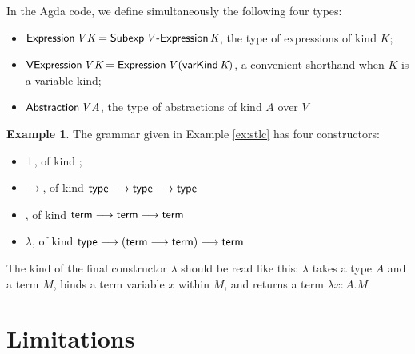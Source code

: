 \documentclass{article}
\theoremstyle{definition}
\newtheorem{example}{Example}[section]
\begin{document}
In the Agda code, we define simultaneously the following four types:
\begin{itemize}
 \item $\AgdaFunction{Expression} \, \AgdaBound{V} \, \AgdaBound{K} = \AgdaDatatype{Subexp} \, \AgdaBound{V} \, \AgdaInductiveConstructor{-Expression} \, \AgdaBound{K}$,
the type of expressions of kind $K$;
\item $\AgdaFunction{VExpression} \, \AgdaBound{V} \, \AgdaBound{K} = \AgdaFunction{Expression} \,
\AgdaBound{V} \, (\AgdaInductiveConstructor{varKind} \, \AgdaBound{K})$, a convenient
shorthand when $K$ is a variable kind;
\item $\AgdaFunction{Abstraction} \, \AgdaBound{V} \, \AgdaBound{A}$, the type of abstractions
of kind $A$ over $V$
\end{itemize}

\begin{example}
The grammar given in Example \ref{ex:stlc} has four constructors:
\begin{itemize}
 \item
$\bot$, of kind ;
\item
$\rightarrow$, of kind $\AgdaFunction{type} \longrightarrow \AgdaFunction{type} \longrightarrow \AgdaFunction{type}$
\item
{}, of kind $\AgdaFunction{term} \longrightarrow \AgdaFunction{term} \longrightarrow \AgdaFunction{term}$
\item
$\lambda$, of kind $\AgdaFunction{type} \longrightarrow (\AgdaFunction{term} \longrightarrow \AgdaFunction{term}) \longrightarrow \AgdaFunction{term}$
\end{itemize}
The kind of the final constructor $\lambda$ should be read like this: $\lambda$ takes a type $A$
and a term $M$, binds a term variable $x$ within $M$, and returns a term $\lambda x:A.M$

\end{example}

\section{Limitations}
\end{document}
